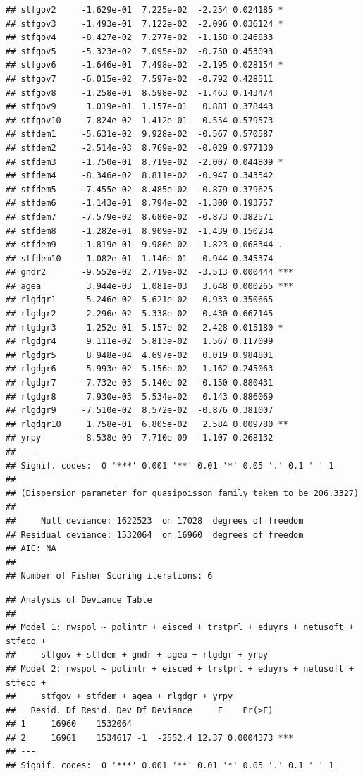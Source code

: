 \documentclass[
]{article}
\begin{document}
\begin{verbatim}
## stfgov2     -1.629e-01  7.225e-02  -2.254 0.024185 *  
## stfgov3     -1.493e-01  7.122e-02  -2.096 0.036124 *  
## stfgov4     -8.427e-02  7.277e-02  -1.158 0.246833    
## stfgov5     -5.323e-02  7.095e-02  -0.750 0.453093    
## stfgov6     -1.646e-01  7.498e-02  -2.195 0.028154 *  
## stfgov7     -6.015e-02  7.597e-02  -0.792 0.428511    
## stfgov8     -1.258e-01  8.598e-02  -1.463 0.143474    
## stfgov9      1.019e-01  1.157e-01   0.881 0.378443    
## stfgov10     7.824e-02  1.412e-01   0.554 0.579573    
## stfdem1     -5.631e-02  9.928e-02  -0.567 0.570587    
## stfdem2     -2.514e-03  8.769e-02  -0.029 0.977130    
## stfdem3     -1.750e-01  8.719e-02  -2.007 0.044809 *  
## stfdem4     -8.346e-02  8.811e-02  -0.947 0.343542    
## stfdem5     -7.455e-02  8.485e-02  -0.879 0.379625    
## stfdem6     -1.143e-01  8.794e-02  -1.300 0.193757    
## stfdem7     -7.579e-02  8.680e-02  -0.873 0.382571    
## stfdem8     -1.282e-01  8.909e-02  -1.439 0.150234    
## stfdem9     -1.819e-01  9.980e-02  -1.823 0.068344 .  
## stfdem10    -1.082e-01  1.146e-01  -0.944 0.345374    
## gndr2       -9.552e-02  2.719e-02  -3.513 0.000444 ***
## agea         3.944e-03  1.081e-03   3.648 0.000265 ***
## rlgdgr1      5.246e-02  5.621e-02   0.933 0.350665    
## rlgdgr2      2.296e-02  5.338e-02   0.430 0.667145    
## rlgdgr3      1.252e-01  5.157e-02   2.428 0.015180 *  
## rlgdgr4      9.111e-02  5.813e-02   1.567 0.117099    
## rlgdgr5      8.948e-04  4.697e-02   0.019 0.984801    
## rlgdgr6      5.993e-02  5.156e-02   1.162 0.245063    
## rlgdgr7     -7.732e-03  5.140e-02  -0.150 0.880431    
## rlgdgr8      7.930e-03  5.534e-02   0.143 0.886069    
## rlgdgr9     -7.510e-02  8.572e-02  -0.876 0.381007    
## rlgdgr10     1.758e-01  6.805e-02   2.584 0.009780 ** 
## yrpy        -8.538e-09  7.710e-09  -1.107 0.268132    
## ---
## Signif. codes:  0 '***' 0.001 '**' 0.01 '*' 0.05 '.' 0.1 ' ' 1
## 
## (Dispersion parameter for quasipoisson family taken to be 206.3327)
## 
##     Null deviance: 1622523  on 17028  degrees of freedom
## Residual deviance: 1532064  on 16960  degrees of freedom
## AIC: NA
## 
## Number of Fisher Scoring iterations: 6
\end{verbatim}

\begin{verbatim}
## Analysis of Deviance Table
## 
## Model 1: nwspol ~ polintr + eisced + trstprl + eduyrs + netusoft + stfeco + 
##     stfgov + stfdem + gndr + agea + rlgdgr + yrpy
## Model 2: nwspol ~ polintr + eisced + trstprl + eduyrs + netusoft + stfeco + 
##     stfgov + stfdem + agea + rlgdgr + yrpy
##   Resid. Df Resid. Dev Df Deviance     F    Pr(>F)    
## 1     16960    1532064                                
## 2     16961    1534617 -1  -2552.4 12.37 0.0004373 ***
## ---
## Signif. codes:  0 '***' 0.001 '**' 0.01 '*' 0.05 '.' 0.1 ' ' 1
\end{verbatim}
\end{document}
